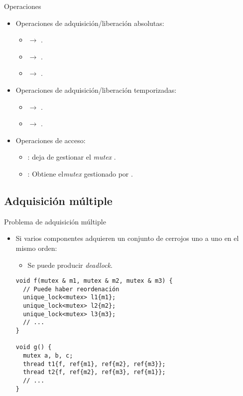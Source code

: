 \begin{frame}{Operaciones}
\begin{itemize}
  \item Operaciones de adquisición/liberación absolutas:
    \begin{itemize}
      \item {} $\rightarrow$ .
      \item {} $\rightarrow$ .
      \item {} $\rightarrow$ .
    \end{itemize}
  \item Operaciones de adquisición/liberación temporizadas:
    \begin{itemize}
      \item {} $\rightarrow$ .
      \item {} $\rightarrow$ .
    \end{itemize}
  \item Operaciones de acceso:
    \begin{itemize}
      \item {}:  deja de gestionar el \emph{mutex} .
      \item {}: Obtiene el\emph{mutex}  gestionado por .
    \end{itemize}
\end{itemize}
\end{frame}

\subsection{Adquisición múltiple}

\begin{frame}[fragile]{Problema de adquisición múltiple}
\begin{itemize}
  \item Si varios componentes adquieren un conjunto de cerrojos uno a uno en el mismo orden:
    \begin{itemize}
      \item Se puede producir \emph{deadlock}.
    \end{itemize}
\begin{lstlisting}
void f(mutex & m1, mutex & m2, mutex & m3) {
  // Puede haber reordenación
  unique_lock<mutex> l1{m1};
  unique_lock<mutex> l2{m2};
  unique_lock<mutex> l3{m3};
  // ...
}

void g() {
  mutex a, b, c;
  thread t1{f, ref{m1}, ref{m2}, ref{m3}};
  thread t2{f, ref{m2}, ref{m3}, ref{m1}};
  // ...
}
\end{lstlisting}
\end{itemize}
\end{frame}

